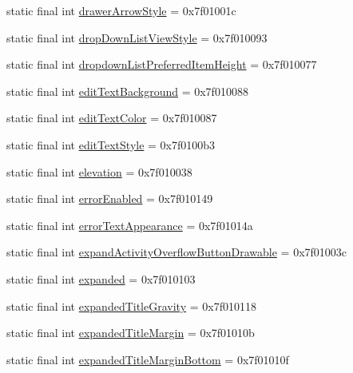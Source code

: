 \begin{CompactItemize}
\item 
static final int \hyperlink{classandroid_1_1support_1_1coreutils_1_1_r_1_1attr_2ec6fe06787985a38073d1ada59bd71d}{drawerArrowStyle} = 0x7f01001c
\item 
static final int \hyperlink{classandroid_1_1support_1_1coreutils_1_1_r_1_1attr_c58464ada34fc23158f96091b8e9a751}{dropDownListViewStyle} = 0x7f010093
\item 
static final int \hyperlink{classandroid_1_1support_1_1coreutils_1_1_r_1_1attr_2f20a05f4809a21b21a29c9e1a6cedd5}{dropdownListPreferredItemHeight} = 0x7f010077
\item 
static final int \hyperlink{classandroid_1_1support_1_1coreutils_1_1_r_1_1attr_66c34be0f3aa4d6418034c3d702d42c0}{editTextBackground} = 0x7f010088
\item 
static final int \hyperlink{classandroid_1_1support_1_1coreutils_1_1_r_1_1attr_5edb9ad9891164f8f9b3f457b80d8198}{editTextColor} = 0x7f010087
\item 
static final int \hyperlink{classandroid_1_1support_1_1coreutils_1_1_r_1_1attr_b8ce610e921c44d0aa5447b7e6b67015}{editTextStyle} = 0x7f0100b3
\item 
static final int \hyperlink{classandroid_1_1support_1_1coreutils_1_1_r_1_1attr_2f73c60c1d6285a5a55b5e68c4c77abb}{elevation} = 0x7f010038
\item 
static final int \hyperlink{classandroid_1_1support_1_1coreutils_1_1_r_1_1attr_e490dd76d90a5dccf7340af17bf85485}{errorEnabled} = 0x7f010149
\item 
static final int \hyperlink{classandroid_1_1support_1_1coreutils_1_1_r_1_1attr_72a9a55f5d756b831839f7e8a72389fe}{errorTextAppearance} = 0x7f01014a
\item 
static final int \hyperlink{classandroid_1_1support_1_1coreutils_1_1_r_1_1attr_0ec8193fabd24b5bb315bc61a9b91764}{expandActivityOverflowButtonDrawable} = 0x7f01003c
\item 
static final int \hyperlink{classandroid_1_1support_1_1coreutils_1_1_r_1_1attr_eabccc734811c3c907fe42d01e7f3efd}{expanded} = 0x7f010103
\item 
static final int \hyperlink{classandroid_1_1support_1_1coreutils_1_1_r_1_1attr_c6a060fcab29f91321710eda4fc8aa82}{expandedTitleGravity} = 0x7f010118
\item 
static final int \hyperlink{classandroid_1_1support_1_1coreutils_1_1_r_1_1attr_bf5cb9b27d43f11587e3d53a30d64034}{expandedTitleMargin} = 0x7f01010b
\item 
static final int \hyperlink{classandroid_1_1support_1_1coreutils_1_1_r_1_1attr_e88564beb69c49b31d9076ed39682e9c}{expandedTitleMarginBottom} = 0x7f01010f

\end{CompactItemize}
